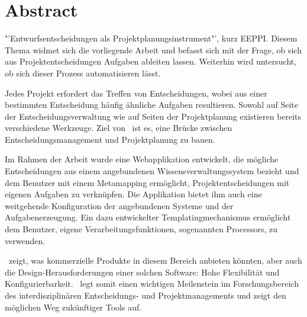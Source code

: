 \chapter{Abstract}
	

	"'Entwurfsentscheidungen als Projektplanungsinstrument"', kurz EEPPI. 
	Diesem Thema widmet sich die vorliegende Arbeit und befasst sich mit der Frage, 
	ob sich aus Projektentscheidungen Aufgaben ableiten lassen.
	Weiterhin wird untersucht, ob sich dieser Prozess automatisieren lässt.

	Jedes Projekt erfordert das Treffen von Entscheidungen, wobei aus einer bestimmten Entscheidung häufig ähnliche Aufgaben resultieren.
	Sowohl auf Seite der Entscheidungsverwaltung wie auf Seiten der Projektplanung existieren bereits verschiedene Werkzeuge.
	Ziel von \eeppi\ ist es, eine Brücke zwischen Entscheidungsmanagement und Projektplanung zu bauen.

	Im Rahmen der Arbeit wurde eine Webapplikation entwickelt, 
	die mögliche Entscheidungen aus einem angebundenen Wissensverwaltungssystem bezieht
	und dem Benutzer mit einem Metamapping ermöglicht,
	Projektentscheidungen mit eigenen Aufgaben zu verknüpfen.
	Die Applikation bietet ihm auch eine weitgehende Konfiguration der angebundenen Systeme und der Aufgabenerzeugung. 
	Ein dazu entwickelter Templatingmechanismus ermöglicht dem Benutzer, eigene Verarbeitungsfunktionen, sogenannten Processors, zu verwenden.

	\eeppi\ zeigt, was kommerzielle Produkte in diesem Bereich anbieten könnten,
	aber auch die Design-Herausforderungen einer solchen Software: 
	Hohe Flexibilität und Konfigurierbarkeit.
	\eeppi\ legt somit einen wichtigen Meilenstein im Forschungsbereich des interdisziplinären Entscheidungs- und Projektmanagements und
	zeigt den möglichen Weg zukünftiger Tools auf.
